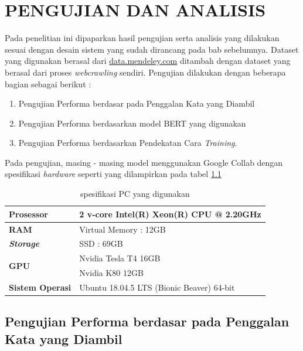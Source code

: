 \chapter{PENGUJIAN DAN ANALISIS}
\label{chap:pengujiananalisis}

Pada penelitian ini dipaparkan hasil pengujian serta analisis yang dilakukan sesuai dengan desain sistem yang sudah dirancang pada bab sebelumnya. Dataset yang digunakan berasal dari \url{data.mendeley.com} ditambah dengan dataset yang berasal dari proses \textit{webcrawling} sendiri. Pengujian dilakukan dengan beberapa bagian sebagai berikut :

\begin{enumerate}[nolistsep]
    \item Pengujian Performa berdasar pada Penggalan Kata yang Diambil
    \item Pengujian Performa berdasarkan model BERT yang digunakan
    \item Pengujian Performa berdasarkan Pendekatan Cara \textit{Training}.
\end{enumerate}

Pada pengujian, masing - masing model menggunakan Google Collab dengan spesifikasi \textit{hardware} seperti yang dilampirkan pada tabel \ref{tab:specs_collab}

\begin{table}
    \caption{spesifikasi PC yang digunakan}
    \label{tab:specs_collab}
    \centering
    \begin{tabular}{|l|l|}
        \hline
        \textbf{Prosessor}            & 2 v-core Intel(R) Xeon(R) CPU @ 2.20GHz   \\ \hline
        \textbf{RAM}                  & Virtual Memory : 12GB                     \\ \hline
        \textit{\textbf{Storage}}     & SSD : 69GB                                \\ \hline
        \multirow{2}{*}{\textbf{GPU}} & Nvidia Tesla T4 16GB                      \\ \cline{2-2}
                                      & Nvidia K80 12GB                           \\ \hline
        \textbf{Sistem Operasi}       & Ubuntu 18.04.5 LTS (Bionic Beaver) 64-bit \\ \hline
    \end{tabular}
\end{table}

\section{Pengujian Performa berdasar pada Penggalan Kata yang Diambil}


